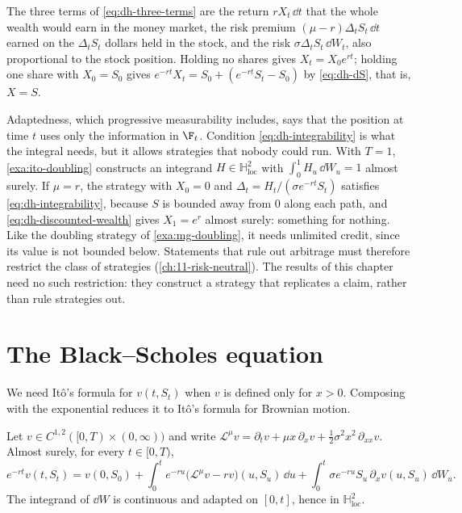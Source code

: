 The three terms of \eqref{eq:dh-three-terms} are the return $rX_t\,\dd t$ that the whole
wealth would earn in the money market, the risk premium $(\mu-r)\Delta_tS_t\,\dd t$ earned on
the $\Delta_tS_t$ dollars held in the stock, and the risk $\sigma\Delta_tS_t\,\dd W_t$, also
proportional to the stock position. Holding no shares gives $X_t=X_0e^{rt}$; holding one share
with $X_0=S_0$ gives $e^{-rt}X_t=S_0+(e^{-rt}S_t-S_0)$ by \eqref{eq:dh-dS}, that is, $X=S$.

\begin{remark}\label{rem:dh-admissible}
Adaptedness, which progressive measurability includes, says that the position at time $t$
uses only the information in $\F_t$. Condition \eqref{eq:dh-integrability} is what the integral
needs, but it allows strategies that nobody could run. With $T=1$, \cref{exa:ito-doubling}
constructs an integrand $H\in\mathbb H^2_{\mathrm{loc}}$ with
$\int_0^1H_u\,\dd W_u=1$ almost surely. If $\mu=r$, the strategy with $X_0=0$ and
$\Delta_t=H_t/(\sigma e^{-rt}S_t)$ satisfies \eqref{eq:dh-integrability}, because $S$ is bounded
away from $0$ along each path, and \eqref{eq:dh-discounted-wealth} gives $X_1=e^r$ almost
surely: something for nothing. Like the doubling strategy of \cref{exa:mg-doubling}, it needs
unlimited credit, since its value is not bounded below. Statements that rule out arbitrage
must therefore restrict the class of strategies (\cref{ch:11-risk-neutral}). The results of
this chapter need no such restriction: they construct a strategy that replicates a claim,
rather than rule strategies out.
\end{remark}

\section{The Black--Scholes equation}\label{sec:dh-pde}

We need It\^o's formula for $v(t,S_t)$ when $v$ is defined only for $x>0$. Composing with the
exponential reduces it to It\^o's formula for Brownian motion.

\begin{lemma}\label{lem:dh-ito}
Let $v\in C^{1,2}([0,T)\times(0,\infty))$ and write
$\mathcal L^\mu v=\partial_tv+\mu x\,\partial_xv+\frac12\sigma^2x^2\,\partial_{xx}v$. Almost surely,
for every $t\in[0,T)$,
\begin{equation}\label{eq:dh-ito}
  e^{-rt}v(t,S_t)=v(0,S_0)+\int_0^te^{-ru}\big(\mathcal L^\mu v-rv\big)(u,S_u)\,\dd u
  +\int_0^t\sigma e^{-ru}S_u\,\partial_xv(u,S_u)\,\dd W_u .
\end{equation}
The integrand of $\dd W$ is continuous and adapted on $[0,t]$, hence in $\mathbb H^2_{\mathrm{loc}}$.
\end{lemma}


